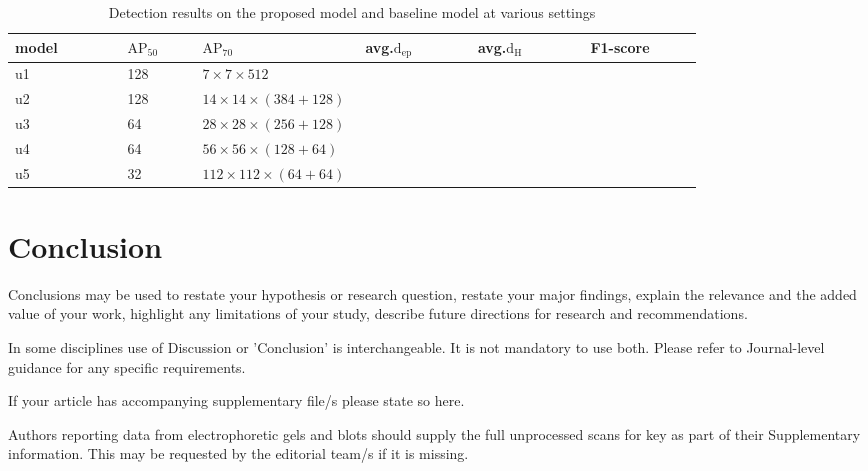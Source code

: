 \documentclass[default,pdflatex,iicol]{sn-jnl}%
\begin{document}
\begin{table*}[]
\centering
\caption{Detection results on the proposed model and baseline model at various settings}
\label{tab-results-indep}
\begin{center}
\begin{tabular}{p{0.15\linewidth}p{0.1\linewidth}p{0.1\linewidth}p{0.15\linewidth}p{0.15\linewidth}p{0.15\linewidth}}%
model & $\mathrm{AP_{50}}$ & $\mathrm{AP_{70}}$ & avg.$\mathrm{d_{ep}}$	& avg.$\mathrm{d_{H}}$	& F1-score	\\ \midrule
u1	&128	    & $7 \times 7 \times 512$              	        \\
u2	&128	    & $14 \times 14 \times (384+128)$    	     \\ 
u3	&64	    & $28 \times 28 \times (256+128)$    	       \\
u4	&64	    & $56 \times 56 \times (128+64)$      	        \\
u5	&32	    & $112 \times 112 \times (64+64)$    	        \\ \bottomrule
\end{tabular}%
\end{center}
\end{table*}


\section{Conclusion}

Conclusions may be used to restate your hypothesis or research question, restate your major findings, explain the relevance and the added value of your work, highlight any limitations of your study, describe future directions for research and recommendations. 

In some disciplines use of Discussion or 'Conclusion' is interchangeable. It is not mandatory to use both. Please refer to Journal-level guidance for any specific requirements. 

\backmatter


If your article has accompanying supplementary file/s please state so here. 

Authors reporting data from electrophoretic gels and blots should supply the full unprocessed scans for key as part of their Supplementary information. This may be requested by the editorial team/s if it is missing.
\end{document}

